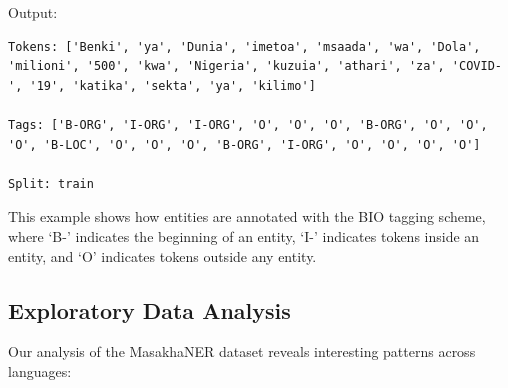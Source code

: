 \documentclass[
]{article}
\begin{document}
Output:

\begin{verbatim}
Tokens: ['Benki', 'ya', 'Dunia', 'imetoa', 'msaada', 'wa', 'Dola', 'milioni', '500', 'kwa', 'Nigeria', 'kuzuia', 'athari', 'za', 'COVID-', '19', 'katika', 'sekta', 'ya', 'kilimo']

Tags: ['B-ORG', 'I-ORG', 'I-ORG', 'O', 'O', 'O', 'B-ORG', 'O', 'O', 'O', 'B-LOC', 'O', 'O', 'O', 'B-ORG', 'I-ORG', 'O', 'O', 'O', 'O']

Split: train
\end{verbatim}

This example shows how entities are annotated with the BIO tagging
scheme, where `B-' indicates the beginning of an entity, `I-' indicates
tokens inside an entity, and `O' indicates tokens outside any entity.

\subsection{Exploratory Data Analysis}\label{exploratory-data-analysis}

Our analysis of the MasakhaNER dataset reveals interesting patterns
across languages:
\end{document}
